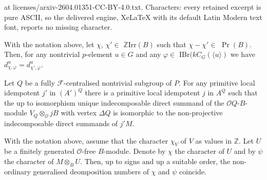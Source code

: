 \documentclass[10pt,a4paper]{amsart}
\def\CF{{\mathcal{F}}}    \def\OS{{\mathcal{O}S}}
\def\CO{{\mathcal{O}}}
\def\IBr{\mathrm{IBr}}
\def\Irr{\mathrm{Irr}}           \def\tenK{\otimes_K}
\def\OQ{{\mathcal{O}Q}}
\def\Z{{\mathbb Z}}
\def\tenB{\otimes_B}
\def\tenO{\otimes_{\mathcal{O}}}
\begin{document}
at licenses/arxiv-2604.01351-CC-BY-4.0.txt. Characters: every retained excerpt is pure ASCII, so the delivered engine, XeLaTeX with its default Latin Modern text font, reports no missing character.
\begin{Lemma} \label{lem1}
With the notation above, let $\chi$, $\chi'\in$ $\Z\Irr(B)$ such that $\chi-\chi'\in$
$\Pr(B)$. Then, for any nontrivial $p$-element $u\in G$ and any $\varphi\in$
$\IBr(kC_G(\langle u\rangle)$ we have 
$d^u_{\chi, \varphi} = d^u_{\chi',\varphi}.$
\end{Lemma}

\begin{Lemma} \label{lem75}
Let  $Q$ be a fully $\CF$-centralised nontrivial subgroup of $P$.
For any primitive local idempotent $j'$ in $(A')^Q$ there is a primitive local
idempotent $j$ in $A^Q$ such that  the up to isomorphism 
unique indecomposable direct summand of the $\OQ$-$B$-module 
$V_Q\tenO jB$ with vertex $\Delta Q$ is isomorphic to the non-projective 
indecomposable direct summands of $j'M$.
\end{Lemma}

\begin{Lemma} \label{lem8}
With the notation above, assume that the character $\chi_V$ of $V$ as values
in $\Z$. Let $U$ be a finitely generated $\CO$-free
$B$-module.  Denote by $\chi$ the character of $U$ and by $\psi$ the
character of $M\tenB U$. Then, up to signs and up a suitable order,
the non-ordinary generalised deomposition numbers of $\chi$ and
$\psi$ coincide.
\end{Lemma}
\end{document}
